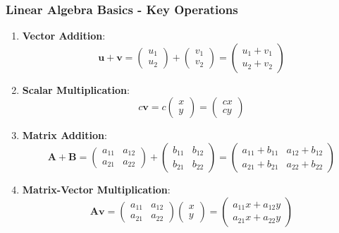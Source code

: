 \documentclass[aspectratio=169]{beamer}
\begin{document}
\begin{frame}[fragile]
    \frametitle{Linear Algebra Basics - Key Operations}
    \begin{enumerate}
        \item \textbf{Vector Addition}:
        \[
        \mathbf{u} + \mathbf{v} = \begin{pmatrix}
        u_1 \\
        u_2
        \end{pmatrix} + \begin{pmatrix}
        v_1 \\
        v_2
        \end{pmatrix} = \begin{pmatrix}
        u_1 + v_1 \\
        u_2 + v_2
        \end{pmatrix}
        \]
        
        \item \textbf{Scalar Multiplication}:
        \[
        c \mathbf{v} = c \begin{pmatrix}
        x \\
        y
        \end{pmatrix} = \begin{pmatrix}
        cx \\
        cy
        \end{pmatrix}
        \]

        \item \textbf{Matrix Addition}:
        \[
        \mathbf{A} + \mathbf{B} = \begin{pmatrix}
        a_{11} & a_{12} \\
        a_{21} & a_{22}
        \end{pmatrix} + \begin{pmatrix}
        b_{11} & b_{12} \\
        b_{21} & b_{22}
        \end{pmatrix} = \begin{pmatrix}
        a_{11} + b_{11} & a_{12} + b_{12} \\
        a_{21} + b_{21} & a_{22} + b_{22}
        \end{pmatrix}
        \]
        
        \item \textbf{Matrix-Vector Multiplication}:
        \[
        \mathbf{A} \mathbf{v} = \begin{pmatrix}
        a_{11} & a_{12} \\
        a_{21} & a_{22}
        \end{pmatrix} \begin{pmatrix}
        x \\
        y
        \end{pmatrix} = \begin{pmatrix}
        a_{11}x + a_{12}y \\
        a_{21}x + a_{22}y
        \end{pmatrix}
        \]
    \end{enumerate}
\end{frame}
\end{document}
